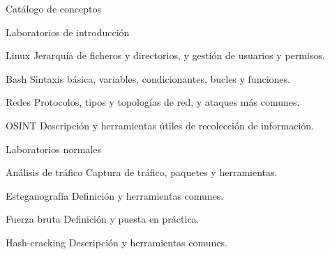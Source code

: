     \begin{frame}
        \Huge{\centerline{Catálogo de conceptos}}
    \end{frame}

    \begin{frame}{Laboratorios de introducción}
        \begin{block}{Linux}
            Jerarquía de ficheros y directorios, y gestión de usuarios y permisos.
        \end{block}
        \begin{block}{Bash}
            Sintaxis básica, variables, condicionantes, bucles y funciones.
        \end{block}

        \begin{block}{Redes}
            Protocolos, tipos y topologías de red, y ataques más comunes.
        \end{block}

        \begin{block}{OSINT}
            Descripción y herramientas útiles de recolección de información.
        \end{block}
    \end{frame}
    
    \begin{frame}{Laboratorios normales}
        \begin{block}{Análisis de tráfico}
            Captura de tráfico, paquetes y herramientas.
        \end{block}

        \begin{block}{Esteganografía}
            Definición y herramientas comunes.
        \end{block}

        \begin{block}{Fuerza bruta}
            Definición y puesta en práctica.
        \end{block}

        \begin{block}{Hash-cracking}
            Descripción y herramientas comunes.
        \end{block}
    \end{frame}
    
